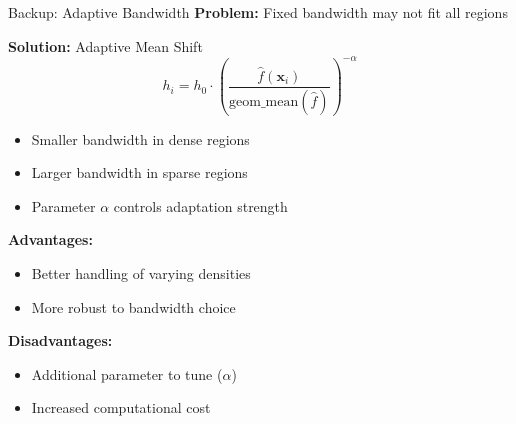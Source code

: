 
\begin{frame}{Backup: Adaptive Bandwidth}
    \textbf{Problem:} Fixed bandwidth may not fit all regions

    \vspace{0.3cm}

    \textbf{Solution:} Adaptive Mean Shift
    \[
    h_i = h_0 \cdot \left(\frac{\hat{f}(\mathbf{x}_i)}{\text{geom\_mean}(\hat{f})}\right)^{-\alpha}
    \]

    \begin{itemize}
        \item Smaller bandwidth in dense regions
        \item Larger bandwidth in sparse regions
        \item Parameter $\alpha$ controls adaptation strength
    \end{itemize}

    \vspace{0.5cm}

    \textbf{Advantages:}
    \begin{itemize}
        \item Better handling of varying densities
        \item More robust to bandwidth choice
    \end{itemize}

    \textbf{Disadvantages:}
    \begin{itemize}
        \item Additional parameter to tune ($\alpha$)
        \item Increased computational cost
    \end{itemize}
\end{frame}

